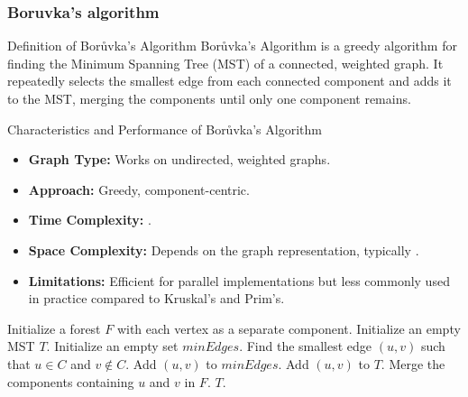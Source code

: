 \newpage
\subsubsection{Boruvka's algorithm}
\begin{definition}[]{Definition of Borůvka's Algorithm}
    Borůvka's Algorithm is a greedy algorithm for finding the Minimum Spanning Tree (MST) of a connected, weighted graph. It repeatedly selects the smallest edge from each connected component and adds it to the MST, merging the components until only one component remains.
\end{definition}

\begin{properties}[]{Characteristics and Performance of Borůvka's Algorithm}
    \begin{itemize}
        \item \textbf{Graph Type:} Works on undirected, weighted graphs.
        \item \textbf{Approach:} Greedy, component-centric.
        \item \textbf{Time Complexity:} .
        \item \textbf{Space Complexity:} Depends on the graph representation, typically .
        \item \textbf{Limitations:} Efficient for parallel implementations but less commonly used in practice compared to Kruskal's and Prim's.
    \end{itemize}
\end{properties}

\begin{algorithm}
    \caption{Borůvka's Algorithm}
    \begin{algorithmic}[1]
            \State Initialize a forest $F$ with each vertex as a separate component.
            \State Initialize an empty MST $T$.
                \State Initialize an empty set $minEdges$.
                    \State Find the smallest edge $(u, v)$ such that $u \in C$ and $v \notin C$.
                    \State Add $(u, v)$ to $minEdges$.
                \EndFor
                        \State Add $(u, v)$ to $T$.
                        \State Merge the components containing $u$ and $v$ in $F$.
                    \EndIf
                \EndFor
            \EndWhile
            \State \Return $T$.
        \EndProcedure
    \end{algorithmic}
\end{algorithm}

